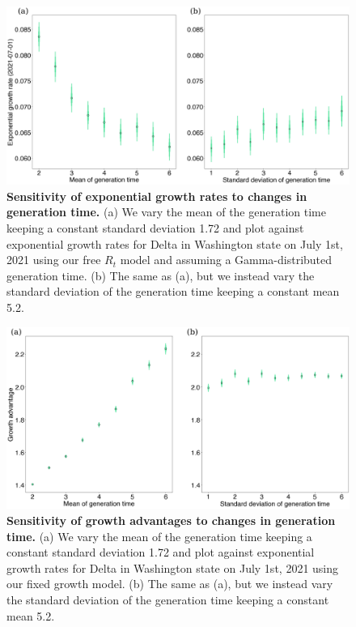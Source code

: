 \documentclass[11pt,oneside,letterpaper]{article}
\begin{document}
\begin{figure}
  \centering
  \includegraphics[width=\linewidth]{figs/little_r_sensitivity.png}
  \caption{\textbf{Sensitivity of exponential growth rates to changes in generation time.} (a) We vary the mean of the generation time keeping a constant standard deviation 1.72 and plot against exponential growth rates for Delta in Washington state on July 1st, 2021 using our free $R_{t}$ model and assuming a Gamma-distributed generation time.  (b) The same as (a), but we instead vary the standard deviation of the generation time keeping a constant mean 5.2. }%
  \label{fig:little_r_sensitivity}
\end{figure}

\begin{figure}
  \centering
  \includegraphics[width=\linewidth]{figs/growth_advantage_sensitivity.png}
  \caption{\textbf{Sensitivity of growth advantages to changes in generation time.} (a) We vary the mean of the generation time keeping a constant standard deviation 1.72 and plot against exponential growth rates for Delta in Washington state on July 1st, 2021 using our fixed growth model.  (b) The same as (a), but we instead vary the standard deviation of the generation time keeping a constant mean 5.2.}%
  \label{fig:growth_advantage_sensitivity}
\end{figure}
\end{document}

